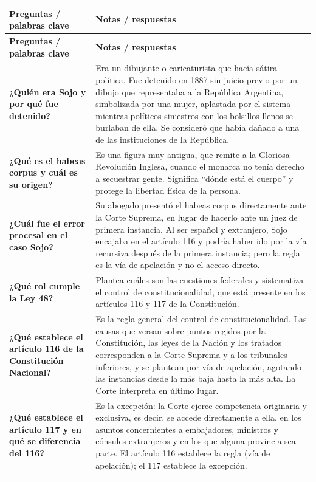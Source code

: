 \documentclass[12pt,oneside,a4paper]{book}
\newcommand{\cornellsep}{\\ \addlinespace \cmidrule{1-2} \addlinespace}
\begin{document}
\begin{longtable}{@{}>{\RaggedRight\arraybackslash}p{}>{\RaggedRight\arraybackslash}p{}@{}}
\toprule
\textbf{Preguntas / palabras clave} & \textbf{Notas / respuestas} \\
\midrule
\endfirsthead
\toprule
\textbf{Preguntas / palabras clave} & \textbf{Notas / respuestas} \\
\midrule
\endhead
\bottomrule
\endfoot
\bottomrule
\endlastfoot

\textbf{¿Quién era Sojo y por qué fue detenido?} &
Era un dibujante o caricaturista que hacía sátira política. Fue detenido en 1887 sin juicio previo por un dibujo que representaba a la República Argentina, simbolizada por una mujer, aplastada por el sistema mientras políticos siniestros con los bolsillos llenos se burlaban de ella. Se consideró que había dañado a una de las instituciones de la República.
\cornellsep

\textbf{¿Qué es el habeas corpus y cuál es su origen?} &
Es una figura muy antigua, que remite a la Gloriosa Revolución Inglesa, cuando el monarca no tenía derecho a secuestrar gente. Significa ``dónde está el cuerpo'' y protege la libertad física de la persona.
\cornellsep

\textbf{¿Cuál fue el error procesal en el caso Sojo?} &
Su abogado presentó el habeas corpus directamente ante la Corte Suprema, en lugar de hacerlo ante un juez de primera instancia. Al ser español y extranjero, Sojo encajaba en el artículo 116 y podría haber ido por la vía recursiva después de la primera instancia; pero la regla es la vía de apelación y no el acceso directo.
\cornellsep

\textbf{¿Qué rol cumple la Ley 48?} &
Plantea cuáles son las cuestiones federales y sistematiza el control de constitucionalidad, que está presente en los artículos 116 y 117 de la Constitución.
\cornellsep

\textbf{¿Qué establece el artículo 116 de la Constitución Nacional?} &
Es la regla general del control de constitucionalidad. Las causas que versan sobre puntos regidos por la Constitución, las leyes de la Nación y los tratados corresponden a la Corte Suprema y a los tribunales inferiores, y se plantean por vía de apelación, agotando las instancias desde la más baja hasta la más alta. La Corte interpreta en último lugar.
\cornellsep

\textbf{¿Qué establece el artículo 117 y en qué se diferencia del 116?} &
Es la excepción: la Corte ejerce competencia originaria y exclusiva, es decir, se accede directamente a ella, en los asuntos concernientes a embajadores, ministros y cónsules extranjeros y en los que alguna provincia sea parte. El artículo 116 establece la regla (vía de apelación); el 117 establece la excepción.
\cornellsep


\end{longtable}
\end{document}
